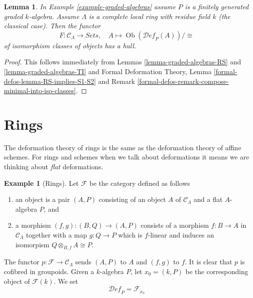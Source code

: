\documentclass{stacks-project}
\theoremstyle{plain}
\newtheorem{lemma}[subsection]{Lemma}
\theoremstyle{definition}
\newtheorem{example}[subsection]{Example}
\theoremstyle{remark}
\numberwithin{equation}{subsection}
\def\Ob{\mathop{\mathrm{Ob}}\nolimits}
\def\Deformationcategory{\mathcal{D}\!\mathit{ef}}
\begin{document}
\begin{lemma}
\label{lemma-graded-algebras-hull}
In Example \ref{example-graded-algebras} assume $P$ is a finitely generated
graded $k$-algebra. Assume $\Lambda$ is a complete local ring
with residue field $k$
(the classical case). Then the functor
$$
F : \mathcal{C}_\Lambda \longrightarrow \textit{Sets},\quad
A \longmapsto \Ob(\Deformationcategory_P(A))/\cong
$$
of isomorphism classes of objects has a hull.
\end{lemma}

\begin{proof}
This follows immediately from Lemmas \ref{lemma-graded-algebras-RS} and
\ref{lemma-graded-algebras-TI} and
Formal Deformation Theory, Lemma \ref{formal-defos-lemma-RS-implies-S1-S2}
and Remark \ref{formal-defos-remark-compose-minimal-into-iso-classes}.
\end{proof}







\section{Rings}
\label{section-rings}

\noindent
The deformation theory of rings is the same as the deformation theory
of affine schemes. For rings and schemes when we talk about deformations
it means we are thinking about {\it flat} deformations.

\begin{example}[Rings]
\label{example-rings}
Let $\mathcal{F}$ be the category defined as follows
\begin{enumerate}
\item an object is a pair $(A, P)$ consisting of an
object $A$ of $\mathcal{C}_\Lambda$ and a flat $A$-algebra $P$, and
\item a morphism $(f, g) : (B, Q) \to (A, P)$ consists of
a morphism $f : B \to A$ in $\mathcal{C}_\Lambda$ together
with a map $g : Q \to P$ which is $f$-linear and induces an
isomorpism $Q \otimes_{B, f} A \cong P$.
\end{enumerate}
The functor $p : \mathcal{F} \to \mathcal{C}_\Lambda$ sends $(A, P)$
to $A$ and $(f, g)$ to $f$. It is clear that $p$ is cofibred in groupoids.
Given a $k$-algebra $P$, let $x_0 = (k, P)$ be the corresponding object
of $\mathcal{F}(k)$. We set
$$
\Deformationcategory_P = \mathcal{F}_{x_0}
$$
\end{example}
\end{document}
